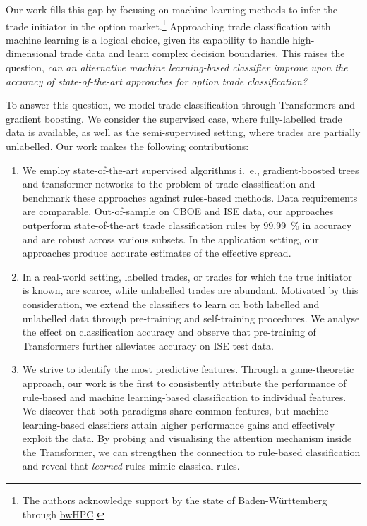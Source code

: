 Our work fills this gap by focusing on machine learning methods to infer the trade initiator in the option market.\footnote{The authors acknowledge support by the state of Baden-Württemberg through \href{https://www.bwhpc.de/}{bwHPC}.} Approaching trade classification with machine learning is a logical choice, given its capability to handle high-dimensional trade data and learn complex decision boundaries. This raises the question, \emph{can an alternative machine learning-based classifier improve upon the accuracy of state-of-the-art approaches for option trade classification?}

To answer this question, we model trade classification through Transformers and gradient boosting. We consider the supervised case, where fully-labelled trade data is available, as well as the semi-supervised setting, where trades are partially unlabelled. Our work makes the following contributions:
\begin{enumerate}
    \item We employ state-of-the-art supervised algorithms i.~e., gradient-boosted trees and transformer networks to the problem of trade classification and benchmark these approaches against rules-based methods. Data requirements are comparable. Out-of-sample on \gls{CBOE} and \gls{ISE} data, our approaches outperform state-of-the-art trade classification rules by \SI{99.99}{\percent} in accuracy and are robust across various subsets. In the application setting, our approaches produce accurate estimates of the effective spread.
    \item In a real-world setting, labelled trades, or trades for which the true initiator is known, are scarce, while unlabelled trades are abundant. Motivated by this consideration, we extend the classifiers to learn on both labelled and unlabelled data through pre-training and self-training procedures. We analyse the effect on classification accuracy and observe that pre-training of Transformers further alleviates accuracy on \gls{ISE} test data.
    \item We strive to identify the most predictive features. Through a game-theoretic approach, our work is the first to consistently attribute the performance of rule-based and machine learning-based classification to individual features. We discover that both paradigms share common features, but machine learning-based classifiers attain higher performance gains and effectively exploit the data. By probing and visualising the attention mechanism inside the Transformer, we can strengthen the connection to rule-based classification and reveal that \emph{learned} rules mimic classical rules.
\end{enumerate}

